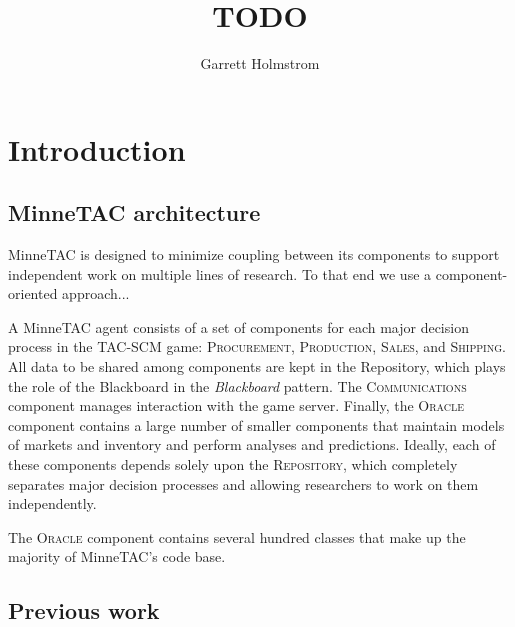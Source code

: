 \documentclass{article}
\begin{document}
\title{TODO}
\author[UMN]{Garrett Holmstrom}

\address[UMN]{Dept. of Computer Science and Engineering,
    University of Minnesota, 4-192 EE/CS Bldg., 200 Union St SE, Minneapolis,
    MN 55455, USA.}

\maketitle

\begin{abstract}

\end{abstract}

\section{Introduction}

\subsection{MinneTAC architecture}


MinneTAC is designed to minimize coupling between its components to support independent work on multiple lines of research.  To that end we use a component-oriented approach...

A MinneTAC agent consists of a set of components for each major decision process in the TAC-SCM game:  \textsc{Procurement}, \textsc{Production}, \textsc{Sales}, and \textsc{Shipping}.  All data to be shared among components are kept in the Repository, which plays the role of the Blackboard in the \emph{Blackboard} pattern\cite{Busch96}.  The \textsc{Communications} component manages interaction with the game server.  Finally, the \textsc{Oracle} component contains a large number of smaller components that maintain models of markets and inventory and perform analyses and predictions.  Ideally, each of these components depends solely upon the \textsc{Repository}, which completely separates major decision processes and allowing researchers to work on them independently.


The \textsc{Oracle} component contains several hundred classes that make up the majority of MinneTAC's code base.

\subsection{Previous work}
\end{document}

